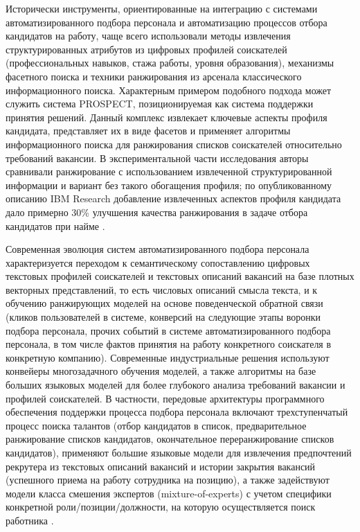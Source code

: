 Исторически инструменты, ориентированные на интеграцию с системами автоматизированного подбора персонала и автоматизацию процессов отбора кандидатов на работу, чаще всего использовали методы извлечения структурированных атрибутов из цифровых профилей соискателей (профессиональных навыков, стажа работы, уровня образования), механизмы фасетного поиска и техники ранжирования из арсенала классического информационного поиска. Характерным примером подобного подхода может служить система PROSPECT, позиционируемая как система поддержки принятия решений. Данный комплекс извлекает ключевые аспекты профиля кандидата, представляет их в виде фасетов и применяет алгоритмы информационного поиска для ранжирования списков соискателей относительно требований вакансии. В экспериментальной части исследования авторы сравнивали ранжирование с использованием извлеченной структурированной информации и вариант без такого обогащения профиля; по опубликованному описанию IBM Research добавление извлеченных аспектов профиля кандидата дало примерно 30\% улучшения качества ранжирования в задаче отбора кандидатов при найме \cite{src03}.\par
Современная эволюция систем автоматизированного подбора персонала характеризуется переходом к семантическому сопоставлению цифровых текстовых профилей соискателей и текстовых описаний вакансий на базе плотных векторных представлений, то есть числовых описаний смысла текста, и к обучению ранжирующих моделей на основе поведенческой обратной связи (кликов пользователей в системе, конверсий на следующие этапы воронки подбора персонала, прочих событий в системе автоматизированного подбора персонала, в том числе фактов принятия на работу конкретного соискателя в конкретную компанию). Современные индустриальные решения используют конвейеры многозадачного обучения моделей, а также алгоритмы на базе больших языковых моделей для более глубокого анализа требований вакансии и профилей соискателей. В частности, передовые архитектуры программного обеспечения поддержки процесса подбора персонала включают трехступенчатый процесс поиска талантов (отбор кандидатов в список, предварительное ранжирование списков кандидатов, окончательное переранжирование списков кандидатов), применяют большие языковые модели для извлечения предпочтений рекрутера из текстовых описаний вакансий и истории закрытия вакансий (успешного приема на работу сотрудника на позицию), а также задействуют модели класса смешения экспертов (mixture-of-experts) с учетом специфики конкретной роли/позиции/должности, на которую осуществляется поиск работника \cite{src17}.\par
